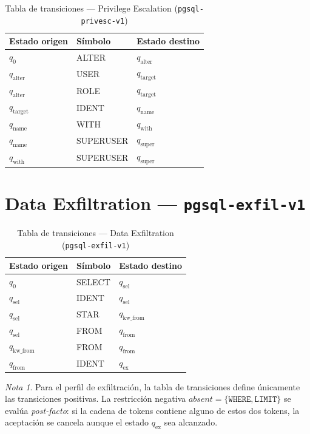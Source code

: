 \documentclass[12pt, a4paper]{report}
\theoremstyle{definition}
\theoremstyle{remark}
\newtheorem{nota}{Nota}[chapter]
\begin{document}
\begin{table}[htbp]
\centering
\caption{Tabla de transiciones — Privilege Escalation (\texttt{pgsql-privesc-v1})}
\label{tab:delta-privesc}
\begin{tabular}{lll}
  \toprule
  \textbf{Estado origen} & \textbf{Símbolo} & \textbf{Estado destino} \\
  \midrule
  $q_0$          & ALTER     & $q_{\text{alter}}$  \\
  $q_{\text{alter}}$  & USER      & $q_{\text{target}}$ \\
  $q_{\text{alter}}$  & ROLE      & $q_{\text{target}}$ \\
  $q_{\text{target}}$ & IDENT     & $q_{\text{name}}$   \\
  $q_{\text{name}}$   & WITH      & $q_{\text{with}}$   \\
  $q_{\text{name}}$   & SUPERUSER & $q_{\text{super}}$  \\
  $q_{\text{with}}$   & SUPERUSER & $q_{\text{super}}$  \\
  \bottomrule
\end{tabular}
\end{table}

\section{Data Exfiltration — \texttt{pgsql-exfil-v1}}

\begin{table}[htbp]
\centering
\caption{Tabla de transiciones — Data Exfiltration (\texttt{pgsql-exfil-v1})}
\label{tab:delta-exfil}
\begin{tabular}{lll}
  \toprule
  \textbf{Estado origen} & \textbf{Símbolo} & \textbf{Estado destino} \\
  \midrule
  $q_0$               & SELECT & $q_{\text{sel}}$   \\
  $q_{\text{sel}}$    & IDENT  & $q_{\text{sel}}$   \\
  $q_{\text{sel}}$    & STAR   & $q_{\text{kw\_from}}$ \\
  $q_{\text{sel}}$    & FROM   & $q_{\text{from}}$  \\
  $q_{\text{kw\_from}}$ & FROM & $q_{\text{from}}$  \\
  $q_{\text{from}}$   & IDENT  & $q_{\text{ex}}$    \\
  \bottomrule
\end{tabular}
\end{table}

\begin{nota}
  Para el perfil de exfiltración, la tabla de transiciones define únicamente
  las transiciones positivas. La restricción negativa $\mathit{absent} =
  \{\texttt{WHERE}, \texttt{LIMIT}\}$ se evalúa \emph{post-facto}: si la cadena
  de tokens contiene alguno de estos dos tokens, la aceptación se cancela
  aunque el estado $q_{\text{ex}}$ sea alcanzado.
\end{nota}
\end{document}
